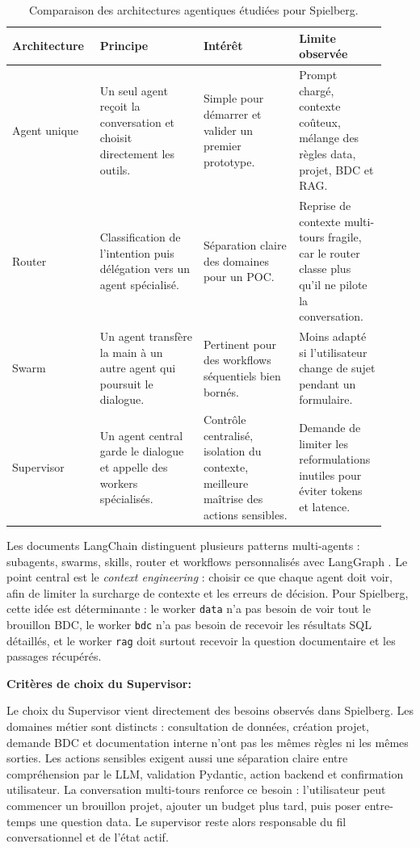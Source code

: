 \documentclass[a4paper,11pt,english,openany]{book}
\begin{document}
\begingroup
\small
\renewcommand{\arraystretch}{1.18}
\setlength{\tabcolsep}{5pt}
\begin{longtable}{|L{0.20\linewidth}|L{0.26\linewidth}|L{0.24\linewidth}|L{0.22\linewidth}|}
\caption{Comparaison des architectures agentiques étudiées pour Spielberg.}\\
\hline
\textbf{Architecture} & \textbf{Principe} & \textbf{Intérêt} & \textbf{Limite observée}\\
\hline
Agent unique
& Un seul agent reçoit la conversation et choisit directement les outils.
& Simple pour démarrer et valider un premier prototype.
& Prompt chargé, contexte coûteux, mélange des règles data, projet, BDC et RAG.\\
\hline
Router
& Classification de l'intention puis délégation vers un agent spécialisé.
& Séparation claire des domaines pour un POC.
& Reprise de contexte multi-tours fragile, car le router classe plus qu'il ne pilote la conversation.\\
\hline
Swarm
& Un agent transfère la main à un autre agent qui poursuit le dialogue.
& Pertinent pour des workflows séquentiels bien bornés.
& Moins adapté si l'utilisateur change de sujet pendant un formulaire.\\
\hline
Supervisor
& Un agent central garde le dialogue et appelle des workers spécialisés.
& Contrôle centralisé, isolation du contexte, meilleure maîtrise des actions sensibles.
& Demande de limiter les reformulations inutiles pour éviter tokens et latence.\\
\hline
\end{longtable}
\endgroup

Les documents LangChain distinguent plusieurs patterns multi-agents : subagents, swarms, skills, router et workflows personnalisés avec LangGraph \cite{langchainmultiagent,langchainsubagents,langchainchoosingmultiagent}. Le point central est le \textit{context engineering} : choisir ce que chaque agent doit voir, afin de limiter la surcharge de contexte et les erreurs de décision. Pour Spielberg, cette idée est déterminante : le worker \texttt{data} n'a pas besoin de voir tout le brouillon BDC, le worker \texttt{bdc} n'a pas besoin de recevoir les résultats SQL détaillés, et le worker \texttt{rag} doit surtout recevoir la question documentaire et les passages récupérés.

\textbf{Critères de choix du Supervisor:}

Le choix du Supervisor vient directement des besoins observés dans Spielberg. Les domaines métier sont distincts : consultation de données, création projet, demande BDC et documentation interne n'ont pas les mêmes règles ni les mêmes sorties. Les actions sensibles exigent aussi une séparation claire entre compréhension par le LLM, validation Pydantic, action backend et confirmation utilisateur. La conversation multi-tours renforce ce besoin : l'utilisateur peut commencer un brouillon projet, ajouter un budget plus tard, puis poser entre-temps une question data. Le supervisor reste alors responsable du fil conversationnel et de l'état actif.
\end{document}
